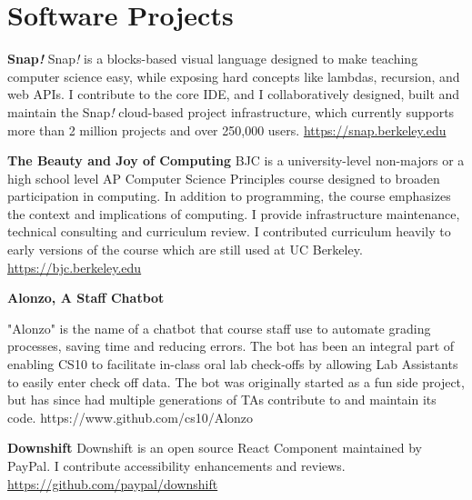 \section{Software Projects}

\vspace{6pt}

\textbf{Snap\textit{!}}
\linebreak
\small Snap\textit{!} is a blocks-based visual language designed to make teaching computer science easy, while exposing hard concepts like lambdas, recursion, and web APIs. I contribute to the core IDE, and I collaboratively designed, built and maintain the Snap\textit{!} cloud-based project infrastructure, which currently supports more than 2 million projects and over 250,000 users.
\newline
\small{\href{https://snap.berkeley.edu}{https://snap.berkeley.edu}}

\vspace{12pt}

\textbf{The Beauty and Joy of Computing}
\newline
\small BJC is a university-level non-majors or a high school level AP Computer Science Principles course designed to broaden participation in computing. In addition to programming, the course emphasizes the context and implications of computing. I provide infrastructure maintenance, technical consulting and curriculum review. I contributed curriculum heavily to early versions of the course which are still used at UC Berkeley.
\newline
\small{\href{https://bjc.berkeley.edu}{https://bjc.berkeley.edu}}

\vspace{12pt}

\textbf{Alonzo, A Staff Chatbot}

\vspace{3pt}

\small{"Alonzo" is the name of a chatbot that course staff use to automate grading processes, saving time and reducing errors. The bot has been an integral part of enabling CS10 to facilitate in-class oral lab check-offs by allowing Lab Assistants to easily enter check off data. The bot was originally started as a fun side project, but has since had multiple generations of TAs contribute to and maintain its code.}
\linebreak
\small{https://www.github.com/cs10/Alonzo}

\vspace{12pt}
\textbf{Downshift}
\newline
\small{Downshift is an open source React Component maintained by PayPal. I contribute accessibility enhancements and reviews.}
\newline
\small{\href{https://github.com/paypal/downshift}{https://github.com/paypal/downshift}}

\vspace{15pt}

